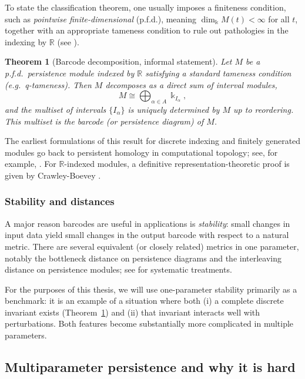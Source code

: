 \documentclass{article}
\newcommand{\kk}{\Bbbk}
\newcommand{\<}{\langle}
\renewcommand{\>}{\rangle}
\newcommand{\bbb}[1]{\ensuremath{\mathbb{#1}}}
\newtheorem{theorem}{Theorem}
\theoremstyle{definition}
\theoremstyle{remark}
\begin{document}
	To state the classification theorem, one usually imposes a finiteness condition,
	such as \emph{pointwise finite-dimensional} (p.f.d.), meaning $\dim_{\kk} M(t)<\infty$
	for all $t$, together with an appropriate tameness condition to rule out pathologies
	in the indexing by $\bbb{R}$ (see \cite{CB15,CDSGO16}).
	
	\begin{theorem}[Barcode decomposition, informal statement]\label{thm:barcode}
		Let $M$ be a p.f.d.\ persistence module indexed by $\bbb{R}$ satisfying a standard
		tameness condition (e.g.\ q-tameness).  Then $M$ decomposes as a direct sum of
		interval modules,
		\[
		M \cong \bigoplus_{\alpha\in A} \kk_{I_\alpha},
		\]
		and the multiset of intervals $\{I_\alpha\}$ is uniquely determined by $M$ up to
		reordering.  This multiset is the \emph{barcode} (or persistence diagram) of $M$.
	\end{theorem}
	
	The earliest formulations of this result for discrete indexing and finitely generated
	modules go back to persistent homology in computational topology; see, for example,
	\cite{ZC05,EH10}.  For $\bbb{R}$-indexed modules,
	a definitive representation-theoretic proof is given by Crawley-Boevey
	\cite{CB15}.
	
	\subsubsection*{Stability and distances}
	
	A major reason barcodes are useful in applications is \emph{stability}: small changes
	in input data yield small changes in the output barcode with respect to a natural
	metric.  There are several equivalent (or closely related) metrics in one parameter,
	notably the bottleneck distance on persistence diagrams and the interleaving distance
	on persistence modules; see \cite{CDSGO16,Les15} for
	systematic treatments.
	
	For the purposes of this thesis, we will use one-parameter stability primarily as a
	benchmark: it is an example of a situation where both (i) a complete discrete
	invariant exists (Theorem~\ref{thm:barcode}) and (ii) that invariant interacts well
	with perturbations.  Both features become substantially more complicated in multiple
	parameters.
	
	\subsection{Multiparameter persistence and why it is hard}\label{sec:background:multi-hard}
	
\end{document}
